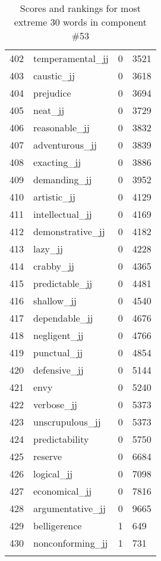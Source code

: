 \begin{longtable}[!htbp]{| rlr@{.}l |}
    402 & temperamental\_jj & 0 & 3521 \\
    403 & caustic\_jj & 0 & 3618 \\
    404 & prejudice & 0 & 3694 \\
    405 & neat\_jj & 0 & 3729 \\
    406 & reasonable\_jj & 0 & 3832 \\
    407 & adventurous\_jj & 0 & 3839 \\
    408 & exacting\_jj & 0 & 3886 \\
    409 & demanding\_jj & 0 & 3952 \\
    410 & artistic\_jj & 0 & 4129 \\
    411 & intellectual\_jj & 0 & 4169 \\
    412 & demonstrative\_jj & 0 & 4182 \\
    413 & lazy\_jj & 0 & 4228 \\
    414 & crabby\_jj & 0 & 4365 \\
    415 & predictable\_jj & 0 & 4481 \\
    416 & shallow\_jj & 0 & 4540 \\
    417 & dependable\_jj & 0 & 4676 \\
    418 & negligent\_jj & 0 & 4766 \\
    419 & punctual\_jj & 0 & 4854 \\
    420 & defensive\_jj & 0 & 5144 \\
    421 & envy & 0 & 5240 \\
    422 & verbose\_jj & 0 & 5373 \\
    423 & unscrupulous\_jj & 0 & 5373 \\
    424 & predictability & 0 & 5750 \\
    425 & reserve & 0 & 6684 \\
    426 & logical\_jj & 0 & 7098 \\
    427 & economical\_jj & 0 & 7816 \\
    428 & argumentative\_jj & 0 & 9665 \\
    429 & belligerence & 1 & 649 \\
    430 & nonconforming\_jj & 1 & 731 \\
    \hline
    \caption{Scores and rankings for most extreme 30 words in component \#53} \\
\end{longtable}
